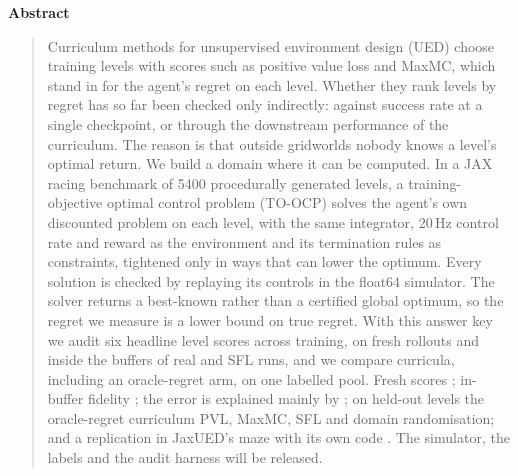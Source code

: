 \begin{center}
  {\large\bfseries Abstract}
\end{center}
\vspace{-0.4em}
\begin{quote}
Curriculum methods for unsupervised environment design (UED) choose training levels with
scores such as positive value loss and MaxMC, which stand in for the agent's regret on
each level. Whether they rank levels by regret has so far been checked only
indirectly: against success rate at a single checkpoint, or through the downstream
performance of the curriculum. The reason is that outside gridworlds nobody knows a
level's optimal return. We build a domain where it can be computed. In a JAX racing
benchmark of
\num{5400} procedurally generated levels, a training-objective optimal control problem
(TO-OCP) solves the agent's own discounted problem on each level, with the same
integrator, 20\,Hz control rate and reward as the environment and its termination rules
as constraints, tightened only in ways that can lower the optimum. Every
solution is checked by replaying its controls in the float64 simulator. The solver
returns a best-known rather than a certified global optimum, so the regret we measure is
a lower bound on true regret. With this answer key we audit six headline level scores
across training, on fresh rollouts and inside the buffers of real \PLRp{} and SFL runs,
and we compare curricula, including an oracle-regret arm, on one labelled pool. Fresh
scores ; in-buffer fidelity ; the error is explained mainly by ; on held-out levels the
oracle-regret curriculum  PVL, MaxMC, SFL and domain
randomisation; and a replication in JaxUED's maze with its own code . The simulator, the labels and the audit harness will be released.
\end{quote}
